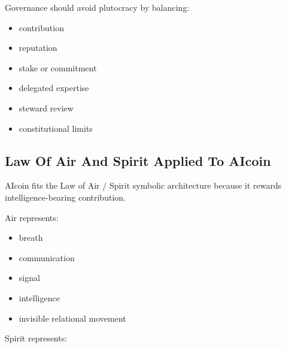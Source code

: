 ﻿\documentclass[12pt]{article}
\begin{document}
Governance should avoid plutocracy by balancing:

\begin{itemize}
  \item contribution
\end{itemize}
\begin{itemize}
  \item reputation
\end{itemize}
\begin{itemize}
  \item stake or commitment
\end{itemize}
\begin{itemize}
  \item delegated expertise
\end{itemize}
\begin{itemize}
  \item steward review
\end{itemize}
\begin{itemize}
  \item constitutional limits
\end{itemize}

\subsection{Law Of Air And Spirit Applied To AIcoin}


AIcoin fits the Law of Air / Spirit symbolic architecture because it rewards intelligence-bearing contribution.

Air represents:

\begin{itemize}
  \item breath
\end{itemize}
\begin{itemize}
  \item communication
\end{itemize}
\begin{itemize}
  \item signal
\end{itemize}
\begin{itemize}
  \item intelligence
\end{itemize}
\begin{itemize}
  \item invisible relational movement
\end{itemize}

Spirit represents:
\end{document}
